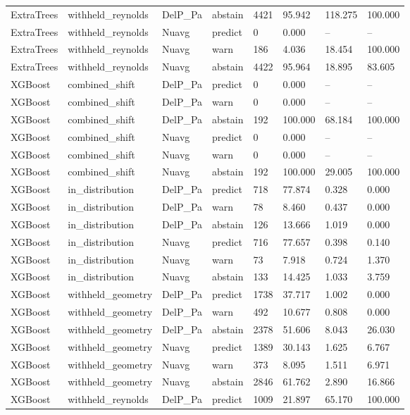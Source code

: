 \begin{tabular}{llllllll}
ExtraTrees & withheld_reynolds & DelP_Pa & abstain & 4421 & 95.942 & 118.275 & 100.000 \\
ExtraTrees & withheld_reynolds & Nuavg & predict & 0 & 0.000 & -- & -- \\
ExtraTrees & withheld_reynolds & Nuavg & warn & 186 & 4.036 & 18.454 & 100.000 \\
ExtraTrees & withheld_reynolds & Nuavg & abstain & 4422 & 95.964 & 18.895 & 83.605 \\
XGBoost & combined_shift & DelP_Pa & predict & 0 & 0.000 & -- & -- \\
XGBoost & combined_shift & DelP_Pa & warn & 0 & 0.000 & -- & -- \\
XGBoost & combined_shift & DelP_Pa & abstain & 192 & 100.000 & 68.184 & 100.000 \\
XGBoost & combined_shift & Nuavg & predict & 0 & 0.000 & -- & -- \\
XGBoost & combined_shift & Nuavg & warn & 0 & 0.000 & -- & -- \\
XGBoost & combined_shift & Nuavg & abstain & 192 & 100.000 & 29.005 & 100.000 \\
XGBoost & in_distribution & DelP_Pa & predict & 718 & 77.874 & 0.328 & 0.000 \\
XGBoost & in_distribution & DelP_Pa & warn & 78 & 8.460 & 0.437 & 0.000 \\
XGBoost & in_distribution & DelP_Pa & abstain & 126 & 13.666 & 1.019 & 0.000 \\
XGBoost & in_distribution & Nuavg & predict & 716 & 77.657 & 0.398 & 0.140 \\
XGBoost & in_distribution & Nuavg & warn & 73 & 7.918 & 0.724 & 1.370 \\
XGBoost & in_distribution & Nuavg & abstain & 133 & 14.425 & 1.033 & 3.759 \\
XGBoost & withheld_geometry & DelP_Pa & predict & 1738 & 37.717 & 1.002 & 0.000 \\
XGBoost & withheld_geometry & DelP_Pa & warn & 492 & 10.677 & 0.808 & 0.000 \\
XGBoost & withheld_geometry & DelP_Pa & abstain & 2378 & 51.606 & 8.043 & 26.030 \\
XGBoost & withheld_geometry & Nuavg & predict & 1389 & 30.143 & 1.625 & 6.767 \\
XGBoost & withheld_geometry & Nuavg & warn & 373 & 8.095 & 1.511 & 6.971 \\
XGBoost & withheld_geometry & Nuavg & abstain & 2846 & 61.762 & 2.890 & 16.866 \\
XGBoost & withheld_reynolds & DelP_Pa & predict & 1009 & 21.897 & 65.170 & 100.000 \\

\end{tabular}

